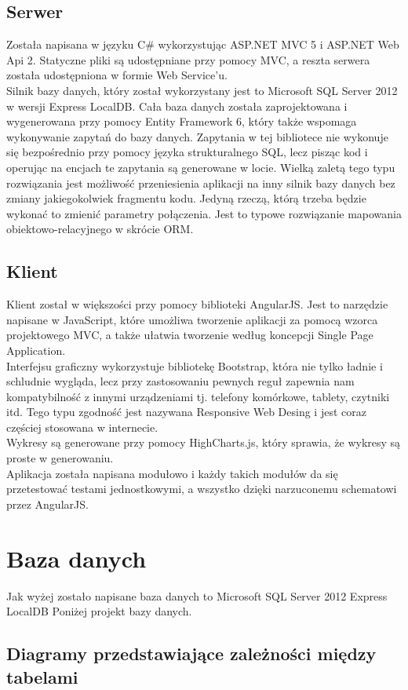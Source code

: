 \documentclass[10pt,titlepage]{article}
\begin{document}
\subsection{Serwer}
Została napisana w języku C\# wykorzystując ASP.NET MVC 5 i ASP.NET Web Api 2. Statyczne pliki są udostępniane przy pomocy MVC, a reszta serwera została udostępniona w formie Web Service'u.\\ Silnik bazy danych, który został wykorzystany jest to Microsoft SQL Server 2012 w wersji Express LocalDB. Cała baza danych została zaprojektowana i wygenerowana przy pomocy Entity Framework 6, który także wspomaga wykonywanie zapytań do bazy danych. Zapytania w tej bibliotece nie wykonuje się bezpośrednio przy pomocy języka strukturalnego SQL, lecz pisząc kod i operując na encjach te zapytania są generowane w locie. Wielką zaletą tego typu rozwiązania jest możliwość przeniesienia aplikacji na inny silnik bazy danych bez zmiany jakiegokolwiek fragmentu kodu. Jedyną rzeczą, którą trzeba będzie wykonać to zmienić parametry połączenia. Jest to typowe rozwiązanie mapowania obiektowo-relacyjnego w skrócie ORM.
\subsection{Klient}
Klient został w większości przy pomocy biblioteki AngularJS. Jest to narzędzie napisane w JavaScript, które umożliwa tworzenie aplikacji za pomocą wzorca projektowego MVC, a także ułatwia tworzenie według koncepcji Single Page Application.\\ Interfejsu graficzny wykorzystuje bibliotekę Bootstrap, która nie tylko ładnie i schludnie wygląda, lecz przy zastosowaniu pewnych reguł zapewnia nam kompatybilność z innymi urządzeniami tj. telefony komórkowe, tablety, czytniki itd. Tego typu zgodność jest nazywana Responsive Web Desing i jest coraz częściej stosowana w internecie.\\ Wykresy są generowane przy pomocy HighCharts.js, który sprawia, że wykresy są proste w generowaniu.\\ Aplikacja została napisana modułowo i każdy takich modułów da się przetestować testami jednostkowymi, a wszystko dzięki narzuconemu schematowi przez AngularJS.
\section{Baza danych}
Jak wyżej zostało napisane baza danych to Microsoft SQL Server 2012 Express LocalDB
Poniżej projekt bazy danych.
\subsection{Diagramy przedstawiające zależności między tabelami}
\end{document}

